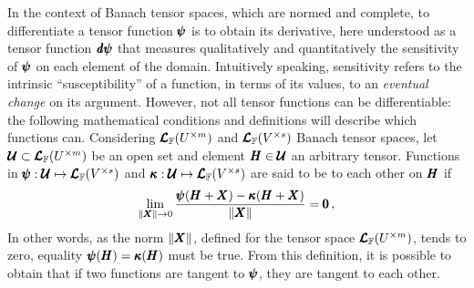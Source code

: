 In the context of Banach tensor spaces, which are normed and complete, to differentiate a tensor function $\pmb{\psi}$ is to obtain its derivative, here understood as a tensor function $\pmb{\mathit{d}\psi}$ that measures qualitatively and quantitatively the sensitivity of $\pmb{\psi}$ on each element of the domain. Intuitively speaking, sensitivity refers to the intrinsic ``susceptibility'' of a function, in terms of its values, to an \emph{eventual change} on its argument. However, not all tensor functions can be differentiable: the following mathematical conditions and definitions will describe which functions can. Considering $\pmb{\mathcal{L}}_{\mathbb{F}}(U^{\times m})$ and $\pmb{\mathcal{L}}_{\mathbb{F}}(V^{\times s})$ Banach tensor spaces, let $\pmb{\mathcal{U}}\subset\pmb{\mathcal{L}}_{\mathbb{F}}(U^{\times m})$ be an open set and element  $\pmb{H}\in\pmb{\mathcal{U}}$ an arbitrary tensor. Functions in $\pmb{\psi} : \pmb{\mathcal{U}} \mapsto \pmb{\mathcal{L}}_{\mathbb{F}}(V^{\times s})$ and $\pmb{\kappa} : \pmb{\mathcal{U}} \mapsto \pmb{\mathcal{L}}_{\mathbb{F}}(V^{\times s})$ are said to be  to each other on $\pmb{H}$ if
\begin{equation}
\lim_{\|\pmb{X}\|\to 0} \dfrac{\pmb{\psi}(\pmb{H}+\pmb{X})-\pmb{\kappa}(\pmb{H}+\pmb{X})}{\|\pmb{X}\|}=\pmb{0}\,,
\end{equation} 
In other words, as the norm $\|\pmb{X}\|$, defined for the tensor space $\pmb{\mathcal{L}}_{\mathbb{F}}(U^{\times m})$, tends to zero, equality $\pmb{\psi}(\pmb{H})=\pmb{\kappa}(\pmb{H})$ must be true. From this definition, it is possible to obtain that if two functions are tangent to $\pmb{\psi}$, they are tangent to each other.   

    
